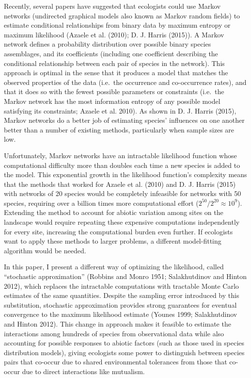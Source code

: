 Recently, several papers have suggested that ecologists could use Markov
networks (undirected graphical models also known as Markov random
fields) to estimate conditional relationships from binary data by
maximum entropy or maximum likelihood (Azaele et al. (2010); D. J.
Harris (2015)). A Markov network defines a probability distribution over
possible binary species assemblages, and its coefficients (including one
coefficient describing the conditional relationship between each pair of
species in the network). This approach is optimal in the sense that it
produces a model that matches the observed properties of the data
(i.e.~the occurrence and co-occurrence rates), and that it does so with
the fewest possible parameters or constraints (i.e.~the Markov network
has the most information entropy of any possible model satisfying its
constraints; Azaele et al. 2010). As shown in D. J. Harris (2015),
Markov networks do a better job of estimating species' influences on one
another better than a number of existing methods, particularly when
sample sizes are low.

Unfortunately, Markov networks have an intractable likelihood function
whose computational difficulty more than doubles each time a new species
is added to the model. This exponential growth in the likelihood
function's complexity means that the methods that worked for Azaele et
al. (2010) and D. J. Harris (2015) with networks of 20 species would be
completely infeasible for networks with 50 species, requiring over a
billion times more computational effort
(\(2^{50}/2^{20} \approx 10^{9}\)). Extending the method to account for
abiotic variation among sites on the landscape would require repeating
these expensive computations independently for every site, increasing
the computational burden even further. If ecologists want to apply these
methods to larger problems, a different model-fitting algorithm would be
needed.

In this paper, I present a different way of optimizing the likelihood,
called ``stochastic approximation'' (Robbins and Monro 1951;
Salakhutdinov and Hinton 2012), which replaces the intractable
computations with tractable Monte Carlo estimates of the same
quantities. Despite the sampling error introduced by this substitution,
stochastic approximation provides strong guarantees for eventual
convergence to the maximum likelihood estimate (Younes 1999;
Salakhutdinov and Hinton 2012). This change in approach makes it
feasible to estimate the interactions among hundreds of species from
observational data while also accounting for possible responses to
abiotic factors (such as those used in species distribution models),
giving ecologists some power to distinguish between species pairs that
co-occur due to shared environmental tolerances from those that co-occur
due to direct interactions like mutualism.

